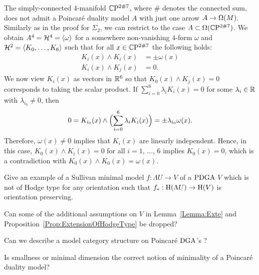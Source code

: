 \documentclass[\MainFolder/Text.tex]{subfiles}
\begin{document}
\begin{Example}
\begin{ExampleList}
\item  The simply-connected $4$-manifold $\mathbb{C}\mathrm{P}^{2\# 7}$, where $\#$ denotes the connected sum, does not admit a Poincar\'e duality model $A$ with just one arrow $A \rightarrow \Omega(M)$. Similarly as in the proof for $\Sigma_2$, we can restrict to the case $A\subset\Omega(\mathbb{C}\mathrm{P}^{2 \# 7})$. We obtain $A^4 = \mathcal{H}^4 = \langle \omega \rangle$ for a somewhere non-vanishing $4$-form $\omega$ and $\mathcal{H}^2 = \langle K_0, \dotsc, K_6 \rangle$ such that for all $x\in \mathbb{C}\mathrm{P}^{2\#7}$ the following holds:
\begin{align*}
	K_i(x)\wedge K_i(x) &= \pm \omega(x) \\
	K_i(x) \wedge K_j(x) &= 0.
\end{align*}
We now view $K_i(x)$ as vectors in $\mathbb{R}^6$ so that $K_0(x)\wedge K_j(x) = 0$ corresponds to taking the scalar product. If $\sum_{i=0}^6 \lambda_i K_i(x) = 0$ for some $\lambda_i\in \mathbb{R}$ with $\lambda_{i_0} \neq 0$, then
\[
0 = K_{i_0}(x) \wedge \Bigl(\sum_{i=0}^6 \lambda_i K_i(x)\Bigr) = \pm \lambda_{i_0} \omega(x).
\]
Therefore, $\omega(x) \neq 0$ implies that $K_i(x)$ are linearly independent. Hence, in this case, $K_0(x) \wedge K_i(x) = 0$ for all $i=1$, $\dotsc$, $6$ implies $K_0(x) = 0$, which is a contradiction with $K_0(x) \wedge K_0(x) = \omega(x)$.\qedhere
\end{ExampleList}
\end{Example}


\begin{Questions}\label{Q:QuestionsPonc}
\begin{RemarkList}
\item Give an example of a Sullivan minimal model $f: \Lambda U \rightarrow V$ of a $\mathrm{PDGA}$ $V$ which is not of Hodge type for any orientation such that $f_*: \mathrm{H}(\Lambda U) \rightarrow \mathrm{H}(V)$ is orientation preserving.
\item Can some of the additional assumptions on $V$ in Lemma~\ref{Lemma:Exte} and Proposition~\ref{Prop:ExtensionOfHodgeType} be dropped?
\item Can we describe a model category structure on Poincar\'e $\mathrm{DGA}$'s ?
\item Is smallness or minimal dimension the correct notion of minimality of a Poincar\'e duality model?  \qedhere
\end{RemarkList}
\end{Questions}
\end{document}
